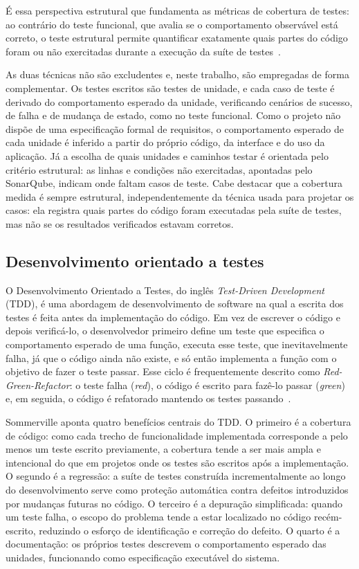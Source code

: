 É essa perspectiva estrutural que fundamenta as métricas de cobertura de testes: ao contrário do teste funcional, que avalia se o comportamento observável está correto, o teste estrutural permite quantificar exatamente quais partes do código foram ou não exercitadas durante a execução da suíte de testes~\cite{myers2011art}.

As duas técnicas não são excludentes e, neste trabalho, são empregadas de forma complementar.
Os testes escritos são testes de unidade, e cada caso de teste é derivado do comportamento esperado da unidade, verificando cenários de sucesso, de falha e de mudança de estado, como no teste funcional.
Como o projeto não dispõe de uma especificação formal de requisitos, o comportamento esperado de cada unidade é inferido a partir do próprio código, da interface e do uso da aplicação.
Já a escolha de quais unidades e caminhos testar é orientada pelo critério estrutural: as linhas e condições não exercitadas, apontadas pelo SonarQube, indicam onde faltam casos de teste.
Cabe destacar que a cobertura medida é sempre estrutural, independentemente da técnica usada para projetar os casos: ela registra quais partes do código foram executadas pela suíte de testes, mas não se os resultados verificados estavam corretos.


\subsection{Desenvolvimento orientado a testes}

O Desenvolvimento Orientado a Testes, do inglês \textit{Test-Driven Development} (TDD), é uma abordagem de desenvolvimento de software na qual a escrita dos testes é feita antes da implementação do código.
Em vez de escrever o código e depois verificá-lo, o desenvolvedor primeiro define um teste que especifica o comportamento esperado de uma função, executa esse teste, que inevitavelmente falha, já que o código ainda não existe, e só então implementa a função com o objetivo de fazer o teste passar.
Esse ciclo é frequentemente descrito como \textit{Red-Green-Refactor}: o teste falha (\textit{red}), o código é escrito para fazê-lo passar (\textit{green}) e, em seguida, o código é refatorado mantendo os testes passando~\cite{sommerville2011software}.

Sommerville aponta quatro benefícios centrais do TDD\@.
O primeiro é a cobertura de código: como cada trecho de funcionalidade implementada corresponde a pelo menos um teste escrito previamente, a cobertura tende a ser mais ampla e intencional do que em projetos onde os testes são escritos após a implementação.
O segundo é a regressão: a suíte de testes construída incrementalmente ao longo do desenvolvimento serve como proteção automática contra defeitos introduzidos por mudanças futuras no código.
O terceiro é a depuração simplificada: quando um teste falha, o escopo do problema tende a estar localizado no código recém-escrito, reduzindo o esforço de identificação e correção do defeito.
O quarto é a documentação: os próprios testes descrevem o comportamento esperado das unidades, funcionando como especificação executável do sistema.~\cite{sommerville2011software}

